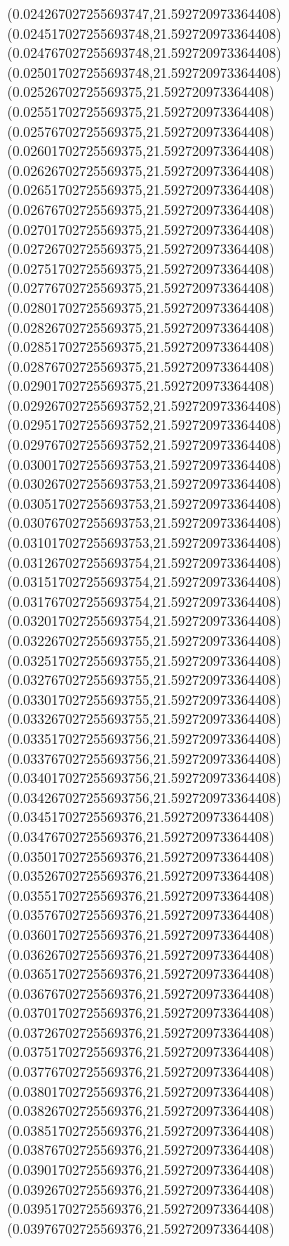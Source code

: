 {(0.024267027255693747,21.592720973364408)
(0.024517027255693748,21.592720973364408)
(0.024767027255693748,21.592720973364408)
(0.025017027255693748,21.592720973364408)
(0.02526702725569375,21.592720973364408)
(0.02551702725569375,21.592720973364408)
(0.02576702725569375,21.592720973364408)
(0.02601702725569375,21.592720973364408)
(0.02626702725569375,21.592720973364408)
(0.02651702725569375,21.592720973364408)
(0.02676702725569375,21.592720973364408)
(0.02701702725569375,21.592720973364408)
(0.02726702725569375,21.592720973364408)
(0.02751702725569375,21.592720973364408)
(0.02776702725569375,21.592720973364408)
(0.02801702725569375,21.592720973364408)
(0.02826702725569375,21.592720973364408)
(0.02851702725569375,21.592720973364408)
(0.02876702725569375,21.592720973364408)
(0.02901702725569375,21.592720973364408)
(0.029267027255693752,21.592720973364408)
(0.029517027255693752,21.592720973364408)
(0.029767027255693752,21.592720973364408)
(0.030017027255693753,21.592720973364408)
(0.030267027255693753,21.592720973364408)
(0.030517027255693753,21.592720973364408)
(0.030767027255693753,21.592720973364408)
(0.031017027255693753,21.592720973364408)
(0.031267027255693754,21.592720973364408)
(0.031517027255693754,21.592720973364408)
(0.031767027255693754,21.592720973364408)
(0.032017027255693754,21.592720973364408)
(0.032267027255693755,21.592720973364408)
(0.032517027255693755,21.592720973364408)
(0.032767027255693755,21.592720973364408)
(0.033017027255693755,21.592720973364408)
(0.033267027255693755,21.592720973364408)
(0.033517027255693756,21.592720973364408)
(0.033767027255693756,21.592720973364408)
(0.034017027255693756,21.592720973364408)
(0.034267027255693756,21.592720973364408)
(0.03451702725569376,21.592720973364408)
(0.03476702725569376,21.592720973364408)
(0.03501702725569376,21.592720973364408)
(0.03526702725569376,21.592720973364408)
(0.03551702725569376,21.592720973364408)
(0.03576702725569376,21.592720973364408)
(0.03601702725569376,21.592720973364408)
(0.03626702725569376,21.592720973364408)
(0.03651702725569376,21.592720973364408)
(0.03676702725569376,21.592720973364408)
(0.03701702725569376,21.592720973364408)
(0.03726702725569376,21.592720973364408)
(0.03751702725569376,21.592720973364408)
(0.03776702725569376,21.592720973364408)
(0.03801702725569376,21.592720973364408)
(0.03826702725569376,21.592720973364408)
(0.03851702725569376,21.592720973364408)
(0.03876702725569376,21.592720973364408)
(0.03901702725569376,21.592720973364408)
(0.03926702725569376,21.592720973364408)
(0.03951702725569376,21.592720973364408)
(0.03976702725569376,21.592720973364408)
}
